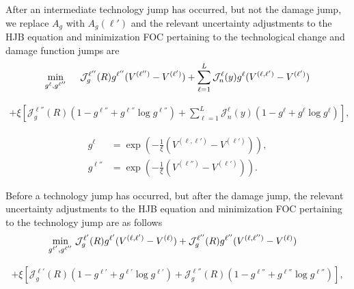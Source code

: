 \documentclass[12pt]{article}
\begin{document}
\begin{appendices}
After an intermediate technology jump has occurred, but not the damage jump, we replace $A_g$ with $A_g(\ell')$ and the relevant uncertainty adjustments to the HJB equation and minimization FOC pertaining to the technological change and damage function jumps are
\begin{eqnarray*}
\min_{g^{\ell},g^{\ell''}} \hspace{0.1cm} \quad
 \mathcal{J}^{\ell''}_g(R) g^{\ell''} (V^{(\ell'')}-V^{(\ell')}) + \sum_{\ell=1}^{L} \mathcal{J}^{\ell}_n(y) g^{\ell} (V^{(\ell,\ell')} - V^{(\ell')})
\end{eqnarray*}

\vspace{-0.75cm}

\begin{eqnarray*}
 + \xi \left[ \mathcal{J}^{\ell''}_g(R) \left( 1 - g^{\ell''} + g^{\ell''} \log g^{\ell''} \right)  +\sum_{\ell=1}^{L} \mathcal{J}^{\ell}_n(y) \left( 1 - g^{\ell} + g^{\ell} \log g^{\ell} \right) \right],
\end{eqnarray*}

\vspace{-0.75cm}

\begin{eqnarray*}
g^{\ell} & =  \exp \left( -\frac{1}{\xi} (V^{(\ell,\ell')} - V^{(\ell')}) \right), \\
g^{\ell''} & = \exp \left( -\frac{1}{\xi} (V^{(\ell'')} - V^{(\ell')}) \right).  
\end{eqnarray*}

Before a technology jump has occurred, but after the damage jump, the relevant uncertainty adjustments to the HJB equation and minimization FOC pertaining to the technology jump are as follows
\begin{eqnarray*}
\min_{g^{\ell'}, g^{\ell''}} \hspace{0.1cm} & \mathcal{J}^{\ell'}_g(R) g^{\ell'} (V^{(\ell,\ell')}-V^{(\ell)}) + \mathcal{J}^{\ell''}_g(R) g^{\ell''} (V^{(\ell,\ell'')}-V^{(\ell)})
\end{eqnarray*}

\vspace{-0.75cm}

\begin{eqnarray*}
 + \xi \left[ \mathcal{J}^{\ell'}_g(R) \left( 1 - g^{\ell'} + g^{\ell'} \log g^{\ell'} \right) + \mathcal{J}^{\ell''}_g(R) \left( 1 - g^{\ell''} + g^{\ell''} \log g^{\ell''} \right) \right],
\end{eqnarray*}


\end{appendices}
\end{document}
